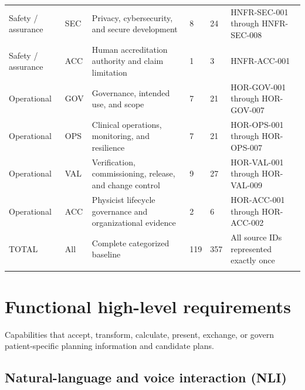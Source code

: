 \documentclass[11pt,letterpaper]{article}
\begin{document}
\begin{scriptsize}
\begin{longtable}{@{}L{0.10\textwidth}L{0.065\textwidth}L{0.34\textwidth}L{0.065\textwidth}L{0.065\textwidth}L{0.26\textwidth}@{}}
\addlinespace[2pt]
Safety / assurance & SEC & Privacy, cybersecurity, and secure development & 8 & 24 & HNFR-SEC-001 through HNFR-SEC-008 \\
\addlinespace[2pt]
Safety / assurance & ACC & Human accreditation authority and claim limitation & 1 & 3 & HNFR-ACC-001 \\
\addlinespace[2pt]
Operational & GOV & Governance, intended use, and scope & 7 & 21 & HOR-GOV-001 through HOR-GOV-007 \\
\addlinespace[2pt]
Operational & OPS & Clinical operations, monitoring, and resilience & 7 & 21 & HOR-OPS-001 through HOR-OPS-007 \\
\addlinespace[2pt]
Operational & VAL & Verification, commissioning, release, and change control & 9 & 27 & HOR-VAL-001 through HOR-VAL-009 \\
\addlinespace[2pt]
Operational & ACC & Physicist lifecycle governance and organizational evidence & 2 & 6 & HOR-ACC-001 through HOR-ACC-002 \\
\addlinespace[2pt]
TOTAL & All & Complete categorized baseline & 119 & 357 & All source IDs represented exactly once \\
\addlinespace[2pt]
\end{longtable}
\end{scriptsize}

\section{Functional high-level requirements}

Capabilities that accept, transform, calculate, present, exchange, or govern patient-specific planning information and candidate plans.

\subsection{Natural-language and voice interaction (NLI)}
\end{document}
